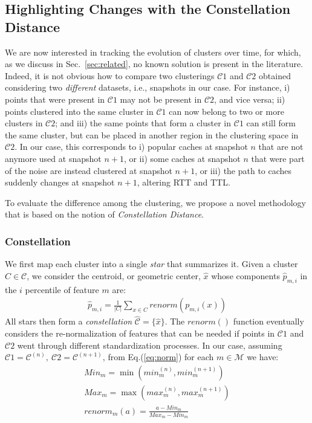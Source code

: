 \documentclass{acm_proc_article-sp}
\newcommand{\distance}{\textit{Constellation Distance}\xspace}
\begin{document}
\subsection{Highlighting Changes with the Constellation Distance}
\label{sec:distance}
We are now interested in tracking the evolution of clusters over time, for which, as we discuss in Sec.~\ref{sec:related}, no known solution is present in the literature. Indeed, it is not obvious how to compare two clusterings $\mathcal{C}1$ and $\mathcal{C}2$ obtained considering two {\it different} datasets, i.e., snapshots in our case.
For instance, i) points that were present in $\mathcal{C}1$ may not be present in $\mathcal{C}2$, and vice versa; ii) points clustered into the same cluster in $\mathcal{C}1$ can now belong to two or more clusters in $\mathcal{C}2$; and iii) the same points that form a cluster in $\mathcal{C}1$ can still form the same cluster, but can be placed in another region in the clustering space in $\mathcal{C}2$. In our case, this corresponds to i) popular caches at snapshot $n$ that are not anymore used at snapshot $n+1$, or ii) some caches at snapshot $n$ that were part of the noise are instead clustered at snapshot $n+1$, or iii) the path to caches suddenly changes at snapshot $n+1$, altering RTT and TTL.

To evaluate the difference among the clustering, we propose a novel methodology that is based on the notion of \distance.

\subsubsection{Constellation}
We first map each cluster into a single {\it star} that summarizes it. Given a cluster $C\in\mathcal{C}$, we consider the centroid, or geometric center,
$\hat{x}$ whose components $\hat{p}_{m,i}$ in the $i$ percentile of feature $m$ are:
\begin{eqnarray}
 \hat{p}_{m,i} = \frac{1}{|C|} \sum_{x\in C}{renorm({p}_{m,i}(x))}
\end{eqnarray}
All stars then form a {\it constellation} $\hat{\mathcal{C}}=\{\hat{x}\}$.
The $renorm()$ function eventually considers the re-normalization of features that can be needed if points in $\mathcal{C}1$ and $\mathcal{C}2$ went through different standardization processes.
In our case, assuming $\mathcal{C}1=\mathcal{C}^{(n)},\ \mathcal{C}2=\mathcal{C}^{(n+1)}$, from Eq.(\ref{eq:norm}) for each $m\in \mathcal{M}$ we have:
\begin{eqnarray}
	Min_m = \min\left(min_m^{(n)},min_m^{(n+1)}\right) \\
	Max_m = \max\left(max_m^{(n)},max_m^{(n+1)}\right) \\
	renorm_m(a) = \frac{a - Min_m}{Max_m - Min_m}
\label{eq:renorm}
\end{eqnarray}
\end{document}
